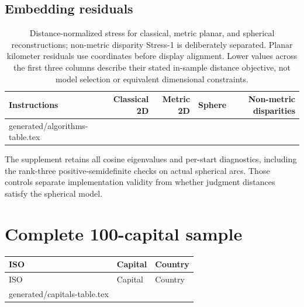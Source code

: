 \documentclass[12pt,a4paper]{article}
\makeatletter
\newcommand{\tableinput}[1]{\@@input #1 }
\makeatother
\begin{document}
\subsection{Embedding residuals}\label{app:algorithms}
\begin{table}[htbp]\centering\small
\caption{Distance-normalized stress for classical, metric planar, and spherical reconstructions; non-metric disparity Stress-1 is deliberately separated. Planar kilometer residuals use coordinates before display alignment. Lower values across the first three columns describe their stated in-sample distance objective, not model selection or equivalent dimensional constraints.}
\begin{tabular}{lrrr|r}\toprule Instructions & Classical 2D & Metric 2D & Sphere & Non-metric disparities \\\midrule
\tableinput{generated/algorithms-table.tex}
\bottomrule\end{tabular}
\end{table}
The supplement retains all cosine eigenvalues and per-start diagnostics, including the rank-three positive-semidefinite checks on actual spherical arcs. Those controls separate implementation validity from whether judgment distances satisfy the spherical model.

\clearpage
\section{Complete 100-capital sample}\label{app:capitals}
\begin{singlespace}
\small
\begin{longtable}{llp{8cm}}
\toprule ISO & Capital & Country \\\midrule\endfirsthead
\toprule ISO & Capital & Country \\\midrule\endhead
\bottomrule\endfoot
\tableinput{generated/capitals-table.tex}
\end{longtable}
\end{singlespace}
\end{document}
